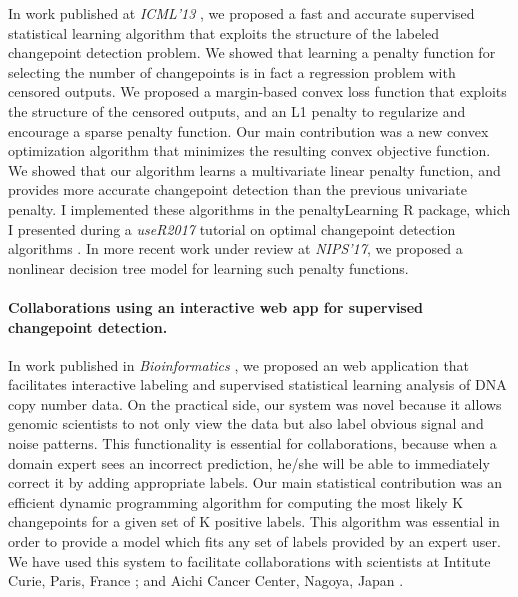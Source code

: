 \documentclass{article}
\begin{document}
In work published at \emph{ICML'13} \citep{HOCKING-penalties}, we
proposed a fast and accurate supervised statistical learning algorithm
that exploits the structure of the labeled changepoint detection
problem. We showed that learning a penalty function for selecting the
number of changepoints is in fact a regression problem with censored
outputs. 
We proposed a margin-based convex loss function that exploits the
structure of the censored outputs, and an L1 penalty to regularize and
encourage a sparse penalty function. Our main contribution was a new
convex optimization algorithm that minimizes the resulting convex
objective function. We showed that our algorithm learns a multivariate
linear penalty function, and provides more accurate changepoint
detection than the previous univariate penalty. I implemented these
algorithms in the penaltyLearning R package, which I presented during
a \emph{useR2017} tutorial on optimal changepoint detection algorithms
\citep{change-tutorial}. In more recent work under review at
\emph{NIPS'17}, we proposed a nonlinear decision tree model for
learning such penalty functions. 

\paragraph{Collaborations using an interactive web app for supervised
  changepoint detection.} In work published in \emph{Bioinformatics}
\citep{hocking-SegAnnDB}, we proposed an web application that
facilitates interactive labeling and supervised statistical learning
analysis of DNA copy number data. On the practical side, our system
was novel because it allows genomic scientists to not only view the
data but also label obvious signal and noise patterns. This
functionality is essential for collaborations, because when a domain
expert sees an incorrect prediction, he/she will be able to
immediately correct it by adding appropriate labels. Our main
statistical contribution was an efficient dynamic programming
algorithm for computing the most likely K changepoints for a given set
of K positive labels. This algorithm was essential in order to provide a model
which fits any set of labels provided by an expert user. We have used
this system to facilitate collaborations with scientists at Intitute
Curie, Paris, France \citep{Chicard}; and Aichi Cancer Center, Nagoya,
Japan \citep{Hocking-Leukemia-2016,m14:clonal}.
\end{document}
